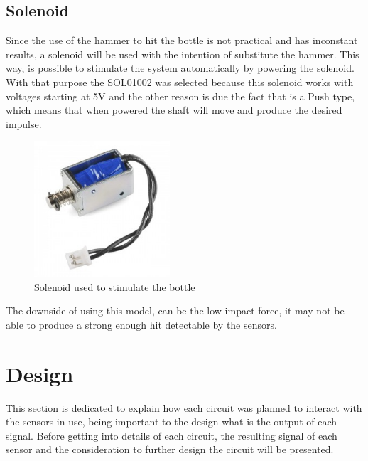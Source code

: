 \subsection{Solenoid}
Since the use of the hammer to hit the bottle is not practical and has inconstant results, a solenoid will be used with the intention of substitute the hammer. This way, is possible to stimulate the system automatically by powering the solenoid. With that purpose the SOL01002 was selected because this solenoid works with voltages starting at 5V and the other reason is due the fact that is a Push type, which means that when powered the shaft will move and produce the desired impulse.
\begin{figure}[]
    \centering
    \includegraphics[width=0.45\textwidth]{Chapters/4CHP/Figures/solenoide.jpg}
    \caption{Solenoid used to stimulate the bottle}
    \label{fig:solenoid}
\end{figure}
The downside of using this model, can be the low impact force, it may not be able to produce a strong enough hit detectable by the sensors.
\section{Design}
This section is dedicated to explain how each circuit was planned to interact with the sensors in use, being important to the design what is the output of each signal. Before getting into details of each circuit, the resulting signal of each sensor and the consideration to further design the circuit will be presented.

